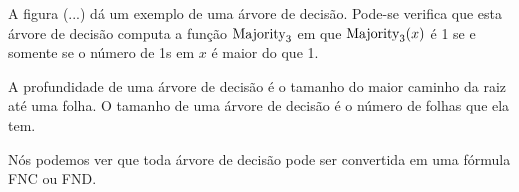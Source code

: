 A figura (...) dá um exemplo de uma árvore de decisão. Pode-se verifica que esta árvore de decisão computa a função $\text{Majority}_{3}$ em que $\text{Majority}_{3}(x)$ é 1 se e somente se o número de 1s em $x$ é maior do que 1.

A profundidade de uma árvore de decisão é o tamanho do maior caminho da raiz até uma folha. O tamanho de uma árvore de decisão é o número de folhas que ela tem.

Nós podemos ver que toda árvore de decisão pode ser convertida em uma fórmula FNC ou FND.